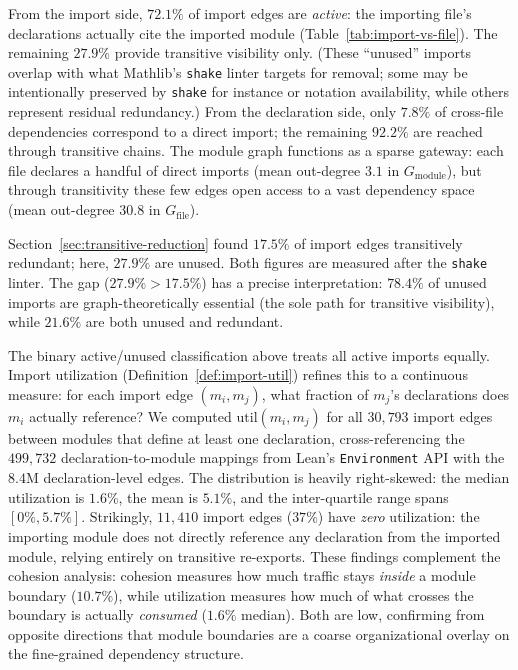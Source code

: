 From the import side, $72.1\%$ of import edges are \emph{active}: the importing file's declarations actually cite the imported module (Table~\ref{tab:import-vs-file}). The remaining $27.9\%$ provide transitive visibility only. (These ``unused'' imports overlap with what Mathlib's \texttt{shake} linter targets for removal; some may be intentionally preserved by \texttt{shake} for instance or notation availability, while others represent residual redundancy.) From the declaration side, only $7.8\%$ of cross-file dependencies correspond to a direct import; the remaining $92.2\%$ are reached through transitive chains. The module graph functions as a sparse gateway: each file declares a handful of direct imports (mean out-degree $3.1$ in $G_{\mathrm{module}}$), but through transitivity these few edges open access to a vast dependency space (mean out-degree $30.8$ in $G_{\mathrm{file}}$).

\label{rem:unused-vs-redundant}
Section~\ref{sec:transitive-reduction} found $17.5\%$ of import edges transitively redundant; here, $27.9\%$ are unused. Both figures are measured after the \texttt{shake} linter. The gap ($27.9\% > 17.5\%$) has a precise interpretation: $78.4\%$ of unused imports are graph-theoretically essential (the sole path for transitive visibility), while $21.6\%$ are both unused and redundant.

The binary active/unused classification above treats all active imports equally. Import utilization (Definition~\ref{def:import-util}) refines this to a continuous measure: for each import edge $(m_i, m_j)$, what fraction of $m_j$'s declarations does $m_i$ actually reference? We computed $\mathrm{util}(m_i, m_j)$ for all $30{,}793$ import edges between modules that define at least one declaration, cross-referencing the $499{,}732$ declaration-to-module mappings from Lean's \texttt{Environment} API with the $8.4$M declaration-level edges. The distribution is heavily right-skewed: the median utilization is $1.6\%$, the mean is $5.1\%$, and the inter-quartile range spans $[0\%, 5.7\%]$. Strikingly, $11{,}410$ import edges ($37\%$) have \emph{zero} utilization: the importing module does not directly reference any declaration from the imported module, relying entirely on transitive re-exports. These findings complement the cohesion analysis: cohesion measures how much traffic stays \emph{inside} a module boundary ($10.7\%$), while utilization measures how much of what crosses the boundary is actually \emph{consumed} ($1.6\%$ median). Both are low, confirming from opposite directions that module boundaries are a coarse organizational overlay on the fine-grained dependency structure.

